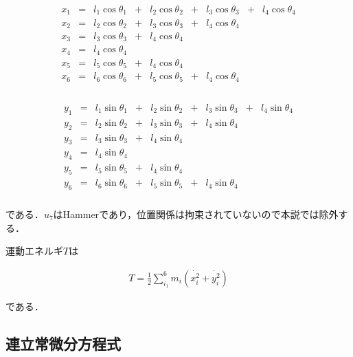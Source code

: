 \begin{eqnarray}
    \begin{matrix}
        x_1 &=& l_1 \cos \theta_1 &+& l_2 \cos \theta_2 &+& l_3 \cos \theta_3 &+& l_4 \cos \theta_4\\
        x_2 &=& l_2 \cos \theta_2 &+& l_3 \cos \theta_3 &+& l_4 \cos \theta_4 & & \\
        x_3 &=& l_3 \cos \theta_3 &+& l_4 \cos \theta_4 & & & &\\
        x_4 &=& l_4 \cos \theta_4 & & & & & &\\
        x_5 &=& l_5 \cos \theta_5 &+& l_4 \cos \theta_4 & & & &\\
        x_6 &=& l_6 \cos \theta_6 &+& l_5 \cos \theta_5 &+& l_4 \cos \theta_4 & &\\
    \end{matrix}
\end{eqnarray}

\begin{eqnarray}
    \begin{matrix}
        y_1 &=& l_1 \sin \theta_1 &+& l_2 \sin \theta_2 &+& l_3 \sin \theta_3 &+& l_4 \sin \theta_4\\
        y_2 &=& l_2 \sin \theta_2 &+& l_3 \sin \theta_3 &+& l_4 \sin \theta_4 & & \\
        y_3 &=& l_3 \sin \theta_3 &+& l_4 \sin \theta_4 & & & &\\
        y_4 &=& l_4 \sin \theta_4 & & & & & &\\
        y_5 &=& l_5 \sin \theta_5 &+& l_4 \sin \theta_4 & & & &\\
        y_6 &=& l_6 \sin \theta_6 &+& l_5 \sin \theta_5 &+& l_4 \sin \theta_4 & & \\
    \end{matrix}
\end{eqnarray}

である．$u_7$はHammerであり，位置関係は拘束されていないので本説では除外する．

運動エネルギ$T$は

\begin{eqnarray}
    T = \frac{1}{2} \sum^6_{i_1} m_i(\dot{x_i^2} + \dot{y_i^2})
\end{eqnarray}

である．



\subsection{連立常微分方程式}

